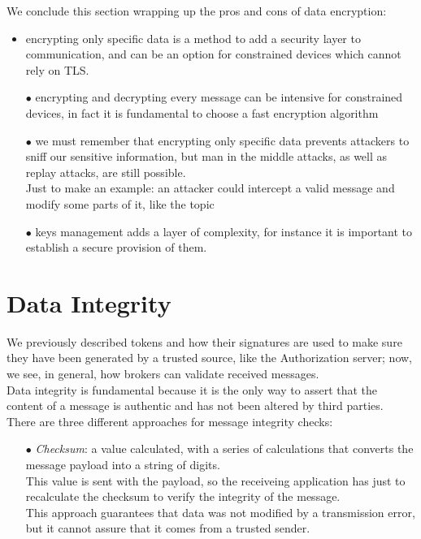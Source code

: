 \documentclass[12pt]{report}
\begin{document}
{We conclude this section wrapping up the pros and cons of data encryption:

\begin{itemize}
\setlength{\itemindent}{+4mm}
\item encrypting only specific data is a method to add a security layer to communication, and can be an option for constrained devices which cannot rely on TLS.
\item[$\bullet$] encrypting and decrypting every message can be intensive for constrained devices, in fact it is fundamental to choose a fast encryption algorithm
\item[$\bullet$] we must remember that encrypting only specific data prevents attackers to sniff our sensitive information, but man in the middle attacks, as well as replay attacks, are still possible.\\ 
Just to make an example: an attacker could intercept a valid message and modify some parts of it, like the topic
\item[$\bullet$] keys management adds a layer of complexity, for instance it is important to establish a secure provision of them.
\end{itemize}
\bigskip

\clearpage
\section{Data Integrity}
\label{sec:dataintegrity}
\bigskip

We previously described tokens and how their signatures are used to make sure they have been generated by a trusted source, like the Authorization server; now, we see, in general, how brokers can validate received messages.\\
Data integrity is fundamental because it is the only way to assert that the content of a message is authentic and has not been altered by third parties.\\
There are three different approaches for message integrity checks:

\begin{itemize}
\setlength{\itemindent}{+4mm}
\item[$\bullet$] \emph{Checksum}: a value calculated, with a series of calculations that converts the message payload into a string of digits.\\
This value is sent with the payload, so the receiveing application has just to recalculate the checksum to verify the integrity of the message.\\
This approach guarantees that data was not modified by a transmission error, but it cannot assure that it comes from a trusted sender.


\end{itemize}}
\end{document}
